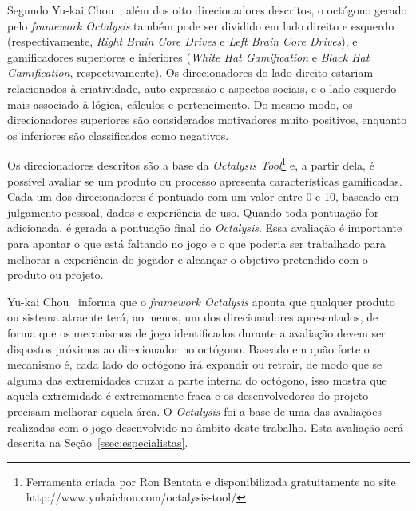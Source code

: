 Segundo Yu-kai Chou~\cite{chou_octalysis_2015}, além dos oito direcionadores descritos, o octógono gerado pelo \textit{framework Octalysis} também pode ser dividido em lado direito e esquerdo (respectivamente, \textit{Right Brain Core Drives} e \textit{Left Brain Core Drives}), e gamificadores superiores e inferiores (\textit{White Hat Gamification} e \textit{Black Hat Gamification}, respectivamente).  Os direcionadores do lado direito estariam relacionados à criatividade, auto-expressão e aspectos sociais, e o lado esquerdo mais associado à lógica, cálculos e pertencimento. Do mesmo modo, os direcionadores superiores são considerados motivadores muito positivos, enquanto os inferiores são classificados como negativos.

Os direcionadores descritos são a base da \textit{Octalysis Tool}\footnote{Ferramenta criada por Ron Bentata e disponibilizada gratuitamente no site http://www.yukaichou.com/octalysis-tool/} e, a partir dela, é possível avaliar se um produto ou processo apresenta características gamificadas. Cada um dos direcionadores é pontuado com um valor entre 0 e 10, baseado em julgamento pessoal, dados e experiência de uso. Quando toda pontuação for adicionada, é gerada a pontuação final do \textit{Octalysis}. Essa avaliação é importante para apontar o que está faltando no jogo e o que poderia ser trabalhado para melhorar a experiência do jogador e alcançar o objetivo pretendido com o produto ou projeto.

Yu-kai Chou~\cite{chou_octalysis_2015} informa que o \textit{framework Octalysis} aponta que qualquer produto ou sistema atraente terá, ao menos, um dos direcionadores apresentados, de forma que os mecanismos de jogo identificados durante a avaliação devem ser dispostos próximos ao direcionador no octógono. Baseado em quão forte o mecanismo é, cada lado do octógono irá expandir ou retrair, de modo que se alguma das extremidades cruzar a parte interna do octógono, isso mostra que aquela extremidade é extremamente fraca e os desenvolvedores do projeto precisam melhorar aquela área. O \textit{Octalysis} foi a base de uma das avaliações realizadas com o jogo desenvolvido no âmbito deste trabalho. Esta avaliação será descrita na Seção~\ref{ssec:especialistas}.


